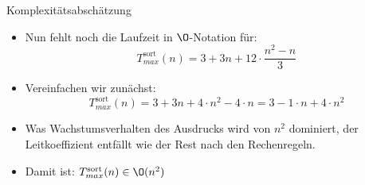 {\begin{frame}{Komplexitätsabschätzung}
    \begin{itemize}[<+(1)->]
        \itemsep9pt
        \item Nun fehlt noch die Laufzeit in \(\O\)-Notation für:
        \begin{equation*}
            T_{max}^{\text{sort}}(n) = 3 + 3n + 12 \cdot \frac{n^2 - n}{3}
        \end{equation*}
        \item Vereinfachen wir zunächst:
        \begin{equation*}
            T_{max}^{\text{sort}}(n) = 3 + 3n + 4\cdot n^2 - 4 \cdot n = 3 - 1\cdot n + 4\cdot n^2
        \end{equation*}
        \item Was Wachstumsverhalten des Ausdrucks wird von \(n^2\) dominiert, der Leitkoeffizient entfällt wie der Rest nach den Rechenregeln.
        \item Damit ist: \(T_{max}^{\text{sort}}(n) \in \O(n^2)\)
    \end{itemize}
\end{frame}
}

